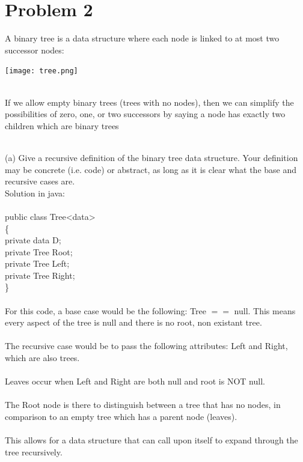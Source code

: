 \documentclass{article}
\newcommand*\moveToRight[1]{\hspace*{0em plus 1fill}\makebox{(#1)}}
\newcommand*\fixindent{ \hspace{1pt}\\}
\begin{document}
\newpage
\section{Problem 2}
\begin{flushleft}
A binary tree is a data structure where each node is linked to at most two successor nodes:\\
\end{flushleft}
\begin{centering}\texttt{[image: tree.png]}
\end{centering}

\fixindent{}
If we allow empty binary trees (trees with no nodes), then we can simplify the possibilities of zero, one, or two successors by saying a node has exactly two children which are binary trees

\fixindent{}
(a) Give a recursive definition of the binary tree data structure. Your definition may be concrete (i.e. code)
or abstract, as long as it is clear what the base and recursive cases are. \moveToRight{4 marks}\\Solution in java:\\\\
\hspace*{50pt}public class Tree\textless  data\textgreater\\
\hspace*{50pt}\{\\
\hspace*{65pt} private data D;\\
\hspace*{65pt} private Tree Root;\\
\hspace*{65pt} private Tree Left;\\
\hspace*{65pt} private Tree Right;\\
\hspace*{50pt}\}\\\\
For this code, a base case would be the following: Tree $==$ null. This means every aspect of the tree is null and there is no root, non existant tree.\\\\
The recursive case would be to pass the following attributes: Left and Right, which are also trees.\\\\
Leaves occur when Left and Right are both null and root is NOT null.\\\\
The Root node is there to distinguish between a tree that has no nodes, in comparison to an empty tree which has a parent node (leaves).\\\\
This allows for a data structure that can call upon itself to expand through the tree recursively.\\
\end{document}
